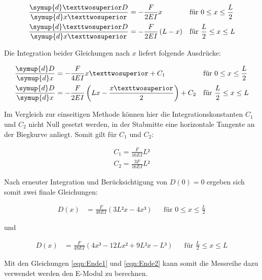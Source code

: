 \begin{align*}
    \frac{\symup{d}²D}{\symup{d}x²} &= -\frac{F}{2EI}x & &\text{für}\,\, 0 \leq x \leq \frac{L}{2}\\
    \frac{\symup{d}²D}{\symup{d}x²} &= -\frac{F}{2EI}\left(L-x\right) & &\text{für}\,\, \frac{L}{2} \leq x \leq L
\end{align*}

\noindent Die Integration beider Gleichungen nach $x$ liefert folgende Ausdrücke:

\begin{align*}
    \frac{\symup{d}D}{\symup{d}x} &= -\frac{F}{4EI}x²+C_1 & &\text{für}\,\, 0 \leq x \leq \frac{L}{2}\\
    \frac{\symup{d}D}{\symup{d}x} &= -\frac{F}{2EI}\left(Lx-\frac{x²}{2}\right)+C_2 & &\text{für}\,\, \frac{L}{2} \leq x \leq L
\end{align*}

\noindent Im Vergleich zur einseitigen Methode können hier die Integrationskonstanten $C_1$ und $C_2$ nicht Null gesetzt werden,
in der Stabmitte eine horizontale Tangente an der Biegkurve anliegt. Somit gilt für $C_1$ und $C_2$:

\begin{gather*}
    C_1 = \frac{F}{16EI}L²\\
    C_2 = \frac{3F}{16EI}L²
\end{gather*}

\noindent Nach erneuter Integration und Berücksichtigung von $D(0) = 0$ ergeben sich somit zwei finale Gleichungen:

\begin{align}
\label{eqn:Ende1}
    D(x) &= \frac{F}{48EI}\left(3L²x-4x³\right) & &\text{für}\,\, 0 \leq x \leq \frac{L}{2}
\end{align}

\noindent und

\begin{align}
\label{eqn:Ende2}
    D(x) &= \frac{F}{48EI}\left(4x³-12Lx²+9L²x-L³\right) & &\text{für}\,\, \frac{L}{2} \leq x \leq L 
\end{align}

\noindent Mit den Gleichungen \eqref{eqn:Ende1} und \eqref{eqn:Ende2} kann somit die Messreihe dazu verwendet werden
den E-Modul zu berechnen.

%